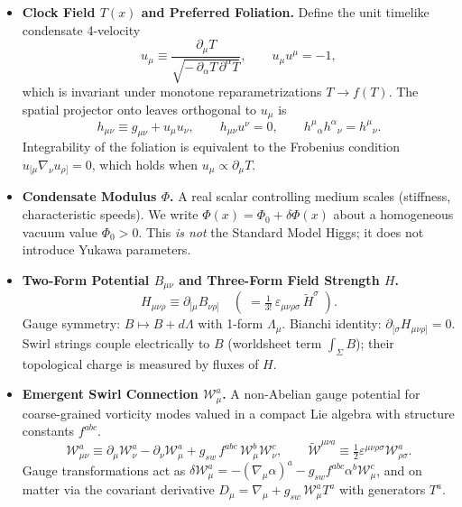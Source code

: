 \documentclass[11pt, preprint,titlepage]{revtex4-2}
\begin{document}
	\begin{itemize}
		\item \textbf{Clock Field \(T(x)\) and Preferred Foliation.}
		Define the unit timelike condensate 4-velocity
		\begin{equation}
			u_{\mu} \equiv \frac{\partial_{\mu}T}{\sqrt{-\,\partial_{\alpha}T\, \partial^{\alpha}T}},
			\qquad u_\mu u^\mu=-1,
		\end{equation}
		which is invariant under monotone reparametrizations \(T\!\to\! f(T)\).
		The spatial projector onto leaves orthogonal to \(u_\mu\) is
		\begin{equation}
			h_{\mu\nu} \equiv g_{\mu\nu}+u_\mu u_\nu, \qquad h_{\mu\nu}u^\nu=0, \qquad h^\mu{}_\alpha h^\alpha{}_\nu=h^\mu{}_\nu.
		\end{equation}
		Integrability of the foliation is equivalent to the Frobenius condition \(u_{[\mu}\nabla_{\nu}u_{\rho]}=0\), which holds when \(u_\mu\propto\partial_\mu T\).

		\item \textbf{Condensate Modulus \(\Phi\).}
		A real scalar controlling medium scales (stiffness, characteristic speeds). We write \(\Phi(x)=\Phi_0+\delta\Phi(x)\) about a homogeneous vacuum value \(\Phi_0>0\). This \emph{is not} the Standard Model Higgs; it does not introduce Yukawa parameters.

		\item \textbf{Two-Form Potential \(B_{\mu\nu}\) and Three-Form Field Strength \(H\).}
		\begin{equation}
			H_{\mu\nu\rho} \equiv \partial_{[\mu} B_{\nu\rho]} \quad (\;= \tfrac{1}{3!}\,\varepsilon_{\mu\nu\rho\sigma}\,\tilde H^{\sigma}\;).
		\end{equation}
		Gauge symmetry: \(B \mapsto B + d\Lambda\) with 1-form \(\Lambda_\mu\). Bianchi identity: \(\partial_{[\sigma}H_{\mu\nu\rho]}=0\).
		Swirl strings couple electrically to \(B\) (worldsheet term \(\int_\Sigma B\)); their topological charge is measured by fluxes of \(H\).

		\item \textbf{Emergent Swirl Connection \(\mathcal{W}_\mu^a\).}
		A non-Abelian gauge potential for coarse-grained vorticity modes valued in a compact Lie algebra with structure constants \(f^{abc}\).
		\begin{equation}
			\mathcal{W}_{\mu\nu}^a \equiv \partial_\mu \mathcal{W}_\nu^a - \partial_\nu \mathcal{W}_\mu^a + g_{\!sw}\, f^{abc}\,\mathcal{W}_\mu^b \mathcal{W}_\nu^c,
			\qquad \tilde{\mathcal{W}}^{\mu\nu a} \equiv \tfrac12 \varepsilon^{\mu\nu\rho\sigma}\mathcal{W}_{\rho\sigma}^a .
		\end{equation}
		Gauge transformations act as \(\delta \mathcal{W}_\mu^a = -(\nabla_\mu \alpha)^a - g_{\!sw} f^{abc}\alpha^b \mathcal{W}_\mu^c\),
		and on matter via the covariant derivative \(D_\mu=\nabla_\mu + g_{\!sw}\,\mathcal{W}_\mu^a T^a\) with generators \(T^a\).


\end{itemize}
\end{document}
